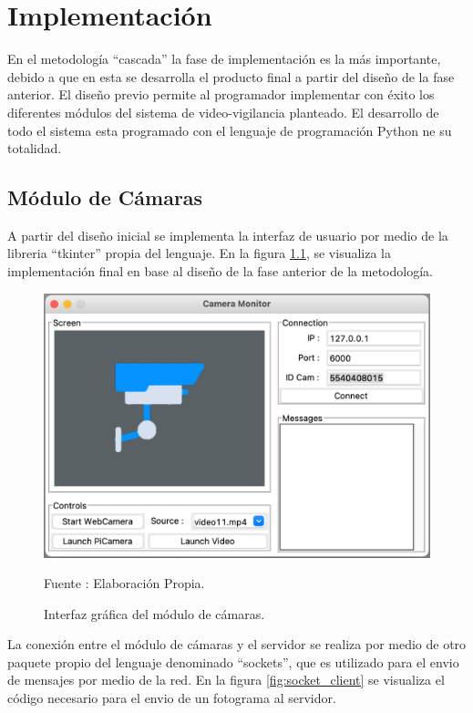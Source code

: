 \chapter{Implementación}
En el metodología ``cascada'' la fase de implementación es la más importante, debido a que en esta se desarrolla el producto final a partir del diseño de la fase anterior. El diseño previo permite al programador implementar con éxito los diferentes módulos del sistema de video-vigilancia planteado. El desarrollo de todo el sistema esta programado con el lenguaje de programación Python ne su totalidad.

\section{Módulo de Cámaras}
A partir del diseño inicial se implementa la interfaz de usuario por medio de la libreria ``tkinter'' propia del lenguaje. En la figura \ref{fig:camera_screen}, se visualiza la implementación final en base al diseño de la fase anterior de la metodología.

\begin{figure}[H]
    \begin{center}
        \includegraphics[width=12cm]{img/capitulo_5/camera_interface.png}        
    \end{center}
    \begin{center}
        \caption{Interfaz gráfica del módulo de cámaras.}
        Fuente : Elaboración Propia.
        \label{fig:camera_screen}
    \end{center}
    
\end{figure}

La conexión entre el módulo de cámaras y el servidor se realiza por medio de otro paquete propio del lenguaje denominado ``sockets'', que es utilizado para el envio de mensajes por medio de la red. En la figura \ref{fig:socket_client} se visualiza el código necesario para el envio de un fotograma al servidor.

